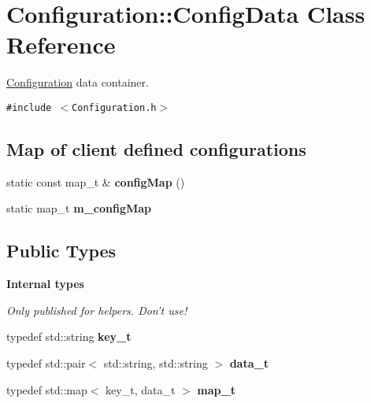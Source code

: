 \hypertarget{classConfiguration_1_1ConfigData}{
\section{Configuration::Config\-Data Class Reference}
\label{classConfiguration_1_1ConfigData}
}
\hyperlink{namespaceConfiguration}{Configuration} data container.  


{\tt \#include $<$Configuration.h$>$}

\subsection*{Map of client defined configurations}
\begin{CompactItemize}
\item 
\hypertarget{classConfiguration_1_1ConfigData_49fc83e7658c150eea1398002ba840b8}{
static const map\_\-t \& \textbf{config\-Map} ()}
\label{classConfiguration_1_1ConfigData_49fc83e7658c150eea1398002ba840b8}

\item 
static map\_\-t \textbf{m\_\-config\-Map}
\end{CompactItemize}
\subsection*{Public Types}
\begin{Indent}{\bf Internal types}\par
{\em Only published for helpers. Don't use! }\begin{CompactItemize}
\item 
\hypertarget{classConfiguration_1_1ConfigData_3702633f7eca5f4f349aba426c0e08c7}{
typedef std::string \textbf{key\_\-t}}
\label{classConfiguration_1_1ConfigData_3702633f7eca5f4f349aba426c0e08c7}

\item 
\hypertarget{classConfiguration_1_1ConfigData_8761ca8629c84e47bb075d11eeef42c7}{
typedef std::pair$<$ std::string, std::string $>$ \textbf{data\_\-t}}
\label{classConfiguration_1_1ConfigData_8761ca8629c84e47bb075d11eeef42c7}

\item 
\hypertarget{classConfiguration_1_1ConfigData_03ab639404bb9cc2e187bf7e64b3413f}{
typedef std::map$<$ key\_\-t, data\_\-t $>$ \textbf{map\_\-t}}
\label{classConfiguration_1_1ConfigData_03ab639404bb9cc2e187bf7e64b3413f}

\end{CompactItemize}
\end{Indent}
